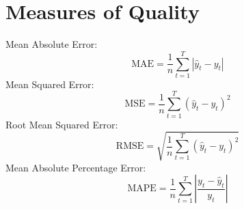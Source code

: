 \section{Measures of Quality}
\label{app:measures_of_quality}
\noindent Mean Absolute Error: $$\text{MAE} = \frac{1}{n}\sum\limits_{t=1}^T |\hat{y}_t - y_t|$$
\noindent Mean Squared Error: $$\text{MSE} = \frac{1}{n} \sum\limits_{t=1}^T \left(\hat{y}_t - y_t\right)^2$$
\noindnet Root Mean Squared Error: $$\text{RMSE} = \sqrt{\frac{1}{n}\sum\limits_{t=1}^T \left(\hat{y}_t - y_t\right)^2}$$
\noindent Mean Absolute Percentage Error: $$\text{MAPE} = \frac{1}{n}\sum\limits_{t=1}^T \left|\frac{y_t - \hat{y}_t}{y_t}\right|$$